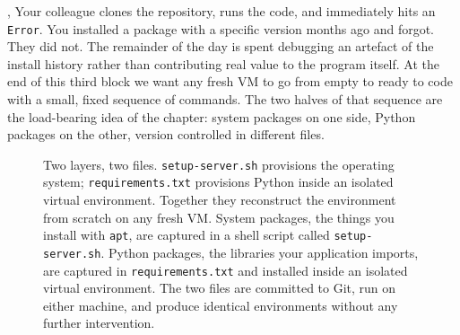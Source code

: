 ,
Your colleague clones the repository, runs the code, and immediately hits an
\texttt{Error}.
You installed a package with a specific version months ago and forgot.
They did not.
The remainder of the day is spent debugging an artefact of the install
history rather than contributing real value to the program itself.
At the end of this third block we want any fresh VM to go from empty
to ready to code with a small, fixed sequence of commands.
The two halves of that sequence are the load-bearing idea of the chapter:
system packages on one side, Python packages on the other,
version controlled in different files. 


\vspace{1.5em}
\begin{figure}
\centering
{}
\caption{Two layers, two files. \protect\texttt{setup-server.sh} provisions the operating system; \protect\texttt{requirements.txt} 
provisions Python inside an isolated virtual environment. Together they reconstruct the environment from scratch on any fresh VM. 
System packages, the things you install with \protect\texttt{apt}\protect{},
are captured in a shell script called \protect\texttt{setup-server.sh}\protect{}.
Python packages, the libraries your application imports,
are captured in \protect\texttt{requirements.txt}\protect{} and installed
inside an isolated virtual environment.
The two files are committed to Git, run on either machine,
and produce identical environments without any further intervention.}
\label{fig:two_layers}
\end{figure}



